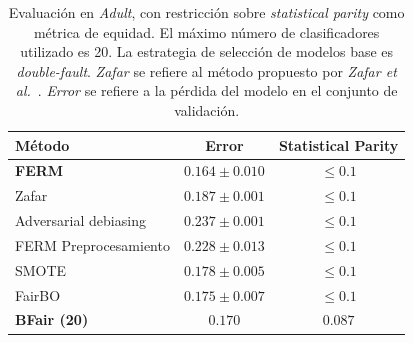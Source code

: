 \begin{table}[H]
    \centering

    \begin{tabular}{lcc}
    \toprule
        Método & Error & Statistical Parity \\
        \midrule \midrule
        \textbf{FERM} & $0.164 \pm 0.010$ & $\leq 0.1$ \\
        Zafar & $0.187 \pm 0.001$ & $\leq 0.1$ \\
        Adversarial debiasing & $0.237 \pm 0.001$ & $\leq 0.1$ \\ 
        \midrule
        FERM Preprocesamiento & $0.228 \pm 0.013$ & $\leq 0.1$ \\
        SMOTE & $0.178 \pm 0.005$ & $\leq 0.1$ \\
        FairBO & $0.175 \pm 0.007$ & $\leq 0.1$ \\  
        \midrule
        \textbf{BFair (20)} & $0.170$ & $0.087$ \\
    \bottomrule
    \end{tabular}

    \caption{
    Evaluación en \emph{Adult}, con restricción sobre \emph{statistical parity} como métrica de equidad.
    El máximo número de clasificadores utilizado es 20.
    La estrategia de selección de modelos base es \emph{double-fault}.
    \emph{Zafar} se refiere al método propuesto por \emph{Zafar et al.}~\parencite{zafar2017fairness}.
    \emph{Error} se refiere a la pérdida del modelo en el conjunto de validación.}
    
    \label{table:second-phase-vs-all}
\end{table}

